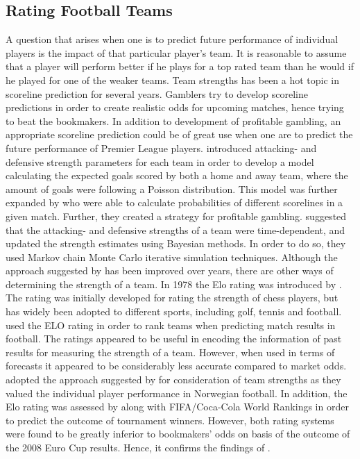 \subsection{Rating Football Teams} \label{Strength_of_football_teams} 
\newpar
A question that arises when one is to predict future performance of individual players is the impact of that particular player's team. It is reasonable to assume that a player will perform better if he plays for a top rated team than he would if he played for one of the weaker teams. Team strengths has been a hot topic in scoreline prediction for several years. Gamblers try to develop scoreline predictions in order to create realistic odds for upcoming matches, hence trying to beat the bookmakers. In addition to development of profitable gambling, an appropriate scoreline prediction could be of great use when one are to predict the future performance of Premier League players. 
\newpar
\cite{Maher} introduced attacking- and defensive strength parameters for each team in order to develop a model calculating the expected goals scored by both a home and away team, where the amount of goals were following a Poisson distribution. This model was further expanded by \cite{Dixon} who were able to calculate probabilities of different scorelines in a given match. Further, they created a strategy for profitable gambling. \cite{Rue} suggested that the attacking- and defensive strengths of a team were time-dependent, and updated the strength estimates using Bayesian methods. In order to do so, they used Markov chain Monte Carlo iterative simulation techniques. 
\newpar
Although the approach suggested by \cite{Maher} has been improved over years, there are other ways of determining the strength of a team. In 1978 the Elo rating was introduced by \cite{Elo}. The rating was initially developed for rating the strength of chess players, but has widely been adopted to different sports, including golf, tennis and football. \cite{Hvattum} used the ELO rating in order to rank teams when predicting match results in football. The ratings appeared to be useful in encoding the information of past results for measuring the strength of a team. However, when used in terms of forecasts it appeared to be considerably less accurate compared to market odds. \cite{vabo} adopted the approach suggested by \cite{Hvattum} for consideration of team strengths as they valued the individual player performance in Norwegian football. In addition, the Elo rating was assessed by \cite{Leitner} along with FIFA/Coca-Cola World Rankings \cite{FIFA} in order to predict the outcome of tournament winners. However, both rating systems were found to be greatly inferior to bookmakers' odds on basis of the outcome of the 2008 Euro Cup results. Hence, it confirms the findings of \cite{Hvattum}. 

